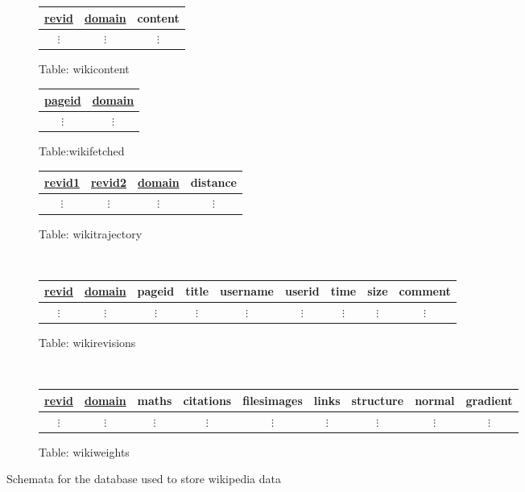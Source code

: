 \begin{figure}
  \vspace{10mm}
  \centering
  \begin{subfigure}[t]{0.3\linewidth}
    \centering
    \begin{tabular}{ccc}
      \toprule
      \underline{revid} & \underline{domain} & content\\
      \midrule
      $\vdots$ & $\vdots$ & $\vdots$\\
    \end{tabular}
    \caption{Table: wikicontent}
  \end{subfigure}
  \begin{subfigure}[t]{0.2\linewidth}
    \centering
    \begin{tabular}{cc}
      \toprule
      \underline{pageid} & \underline{domain} \\
      \midrule
      $\vdots$ & $\vdots$\\
    \end{tabular}
    \caption{Table:\newline wikifetched}
  \end{subfigure}
  \begin{subfigure}[t]{0.4\linewidth}
    \centering
    \begin{tabular}{cccc}
      \toprule
      \underline{revid1} & \underline{revid2} & \underline{domain} & distance\\
      \midrule
      $\vdots$ & $\vdots$ & $\vdots$ & $\vdots$ \\
    \end{tabular}
    \caption{Table: wikitrajectory}
  \end{subfigure}\\
  \vspace{10 mm}
  \begin{subfigure}[b!]{\linewidth}
    \centering
    \begin{tabular}{ccccccccc}
      \toprule
      \underline{revid} & \underline{domain} & pageid & title & username & userid & time & size &
      comment \\ 
      \midrule
      $\vdots$ & $\vdots$ & $\vdots$ & $\vdots$ & $\vdots$ & $\vdots$ & $\vdots$
      & $\vdots$ & $\vdots$ \\
    \end{tabular}
    \caption{Table: wikirevisions}
  \end{subfigure}\
  \vspace{10mm}
  \begin{subfigure}[b!]{\linewidth}
    \centering
    \begin{tabular}{ccccccccc}
      \toprule
      \underline{revid} & \underline{domain} & maths & citations & filesimages & links &
      structure & normal & gradient\\
      \midrule
      $\vdots$ & $\vdots$ & $\vdots$ & $\vdots$ & $\vdots$ & $\vdots$ &
      $\vdots$ & $\vdots$ & $\vdots$ \\
    \end{tabular}
    \caption{Table: wikiweights} 
  \end{subfigure}
  \caption{Schemata for the database used to store wikipedia data}
  \label{database-schema}
\end{figure}

